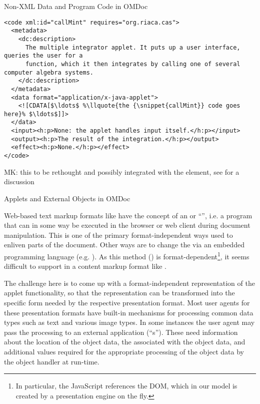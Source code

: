\begin{module}[id=ext]
\begin{omgroup}[id=ext,short=Auxiliary Elements]
\begin{omgroup}[id=private]{Non-XML Data and Program Code in OMDoc}
\begin{lstlisting}[label=lst:callMint,mathescape,escapechar=\%,
  caption={The Program Code for a Java Applet},
  index={code,input,output,effect,data}]
<code xml:id="callMint" requires="org.riaca.cas"> 
  <metadata>
    <dc:description>
      The multiple integrator applet. It puts up a user interface, queries the user for a 
      function, which it then integrates by calling one of several computer algebra systems. 
    </dc:description>
  </metadata>
  <data format="application/x-java-applet">
    <![CDATA[$\ldots$ %\llquote{the {\snippet{callMint}} code goes here}% $\ldots$]]>
  </data> 
  <input><h:p>None: the applet handles input itself.</h:p></input> 
  <output><h:p>The result of the integration.</h:p></output>
  <effect><h:p>None.</h:p></effect> 
</code>
\end{lstlisting}
\end{omgroup}

\begin{oldpart}{MK: this to be rethought and possibly integrated with the
     element, see  for a discussion}
\begin{omgroup}[id=applets]{Applets and External Objects in OMDoc}

Web-based text markup formats like {\html} have the concept of an
{} or ``{}'', i.e.  a program that can in some
way be executed in the browser or web client during document manipulation. This is one of
the primary format-independent ways used to enliven parts of the document.  Other ways are
to change the {} via an embedded programming language
(e.g.  {}). As this method ({}) is
format-dependent\footnote{In particular, the JavaScript references the {\html} DOM, which
  in our model is created by a presentation engine on the fly.}, it seems difficult to
support in a content markup format like \omdoc.
  
The challenge here is to come up with a format-independent representation of the applet
functionality, so that the \omdoc representation can be transformed into the specific
form needed by the respective presentation format.  Most user agents for these
presentation formats have built-in mechanisms for processing common data types such as
text and various image types. In some instances the user agent may pass the processing to
an external application (``{s}'').  These need information about the
location of the object data, the {} associated with the object data,
and additional values required for the appropriate processing of the object data by the
object handler at run-time.


\end{omgroup}
\end{oldpart}
\end{omgroup}
\end{module}

